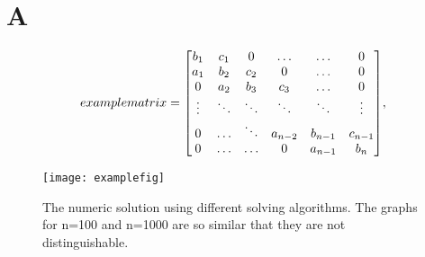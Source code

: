 \onecolumn
\setcounter{equation}{0}
\renewcommand\theequation{A.\arabic{equation}}
\section*{A}
\label{sec:appendix}

  \[examplematrix =
    \mqty[b_1 & c_1 & 0 & \hdots & \hdots & 0 \\
          a_1 & b_2 & c_2 & 0 & \hdots & 0 \\
          0 & a_2 & b_3 & c_3 & \hdots & 0 \\
          \vdots & \ddots & \ddots & \ddots & \ddots & \vdots \\
          0 & \hdots & \ddots & a_{n-2} & b_{n-1} & c_{n-1} \\
          0 & \hdots & \hdots & 0 & a_{n-1} & b_n],
  \]

\begin{figure}[htbp]
	\centering
	\texttt{[image: examplefig]}
	\caption{The numeric solution using different solving algorithms. The graphs for n=100 and n=1000 are so similar that they are not distinguishable.}
	\label{fig:all}
\end{figure}
